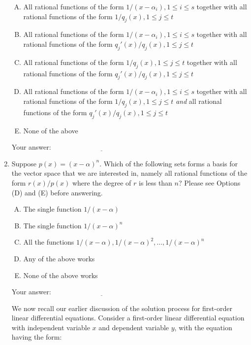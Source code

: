 \documentclass[10pt]{amsart}
\begin{document}
\begin{enumerate}
  \begin{enumerate}[(A)]
  \item All rational functions of the form $1/(x - \alpha_i), 1 \le i
    \le s$ together with all rational functions of the form $1/q_j(x),
    1 \le j \le t$
  \item All rational functions of the form $1/(x - \alpha_i), 1 \le i
    \le s$ together with all rational functions of the form $q_j'(x)/q_j(x),
    1 \le j \le t$
  \item All rational functions of the form $1/q_j(x), 1 \le j \le t$
    together with all rational functions of the form $q_j'(x)/q_j(x),
    1 \le j \le t$
  \item All rational functions of the form $1/(x - \alpha_i), 1 \le i
    \le s$ together with all rational functions of the form $1/q_j(x),
    1 \le j \le t$ {\em and} all rational functions of the form
    $q_j'(x)/q_j(x), 1 \le j \le t$
  \item None of the above
  \end{enumerate}

  \vspace{0.1in}
  Your answer: $\underline{\qquad\qquad\qquad\qquad\qquad\qquad\qquad}$
  \vspace{0.1in}

\item Suppose $p(x) = (x - \alpha)^n$. Which of the following sets
  forms a basis for the vector space that we are interested in, namely
  all rational functions of the form $r(x)/p(x)$ where the degree of
  $r$ is less than $n$? Please see Options (D) and (E) before
  answering.

  \begin{enumerate}[(A)]
  \item The single function $1/(x - \alpha)$
  \item The single function $1/(x - \alpha)^n$
  \item All the functions $1/(x - \alpha), 1/(x - \alpha)^2, \dots, 1/(x - \alpha)^n$
  \item Any of the above works
  \item None of the above works
  \end{enumerate}

  \vspace{0.1in}
  Your answer: $\underline{\qquad\qquad\qquad\qquad\qquad\qquad\qquad}$
  \vspace{0.1in}

  We now recall our earlier discussion of the solution process for
  first-order linear differential equations. Consider a first-order
  linear differential equation with independent variable $x$ and
  dependent variable $y$, with the equation having the form:


\end{enumerate}
\end{document}

